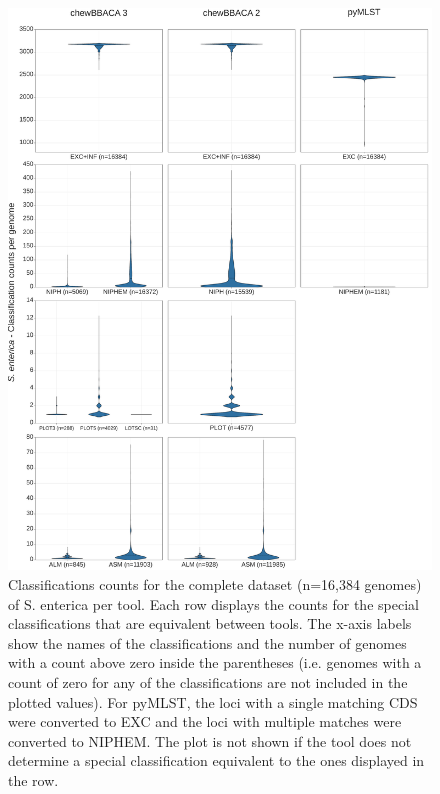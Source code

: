 \newpage
\begin{figure}[h!]
    \centering
    \includegraphics[angle=0,width=\textwidth]{figures/chapter 2/FigureS19.pdf}
    \caption{Classifications counts for the complete dataset (n=16,384 genomes) of S. enterica per tool. Each row displays the counts for the special classifications that are equivalent between tools. The x-axis labels show the names of the classifications and the number of genomes with a count above zero inside the parentheses (i.e. genomes with a count of zero for any of the classifications are not included in the plotted values). For pyMLST, the loci with a single matching CDS were converted to EXC and the loci with multiple matches were converted to NIPHEM. The plot is not shown if the tool does not determine a special classification equivalent to the ones displayed in the row.}
    \label{fig:chap2_figureS19}
\end{figure}

